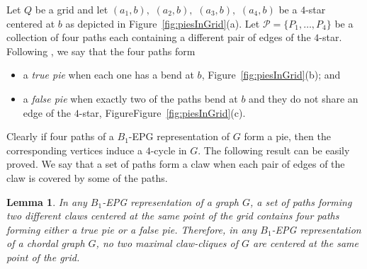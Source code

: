 \documentclass[9pt]{entcs}
\newtheorem{lema}{Lemma}[section]
\newtheorem{defi}{Definition}[section]
\begin{document}

Let $ Q $ be a grid and let $ (a_1, b),$ $(a_2, b),$ $(a_3, b),$ $(a_4, b)$ be a $4$-star centered at $b$ as depicted in Figure~\ref{fig:piesInGrid}(a). Let $ \mathcal{P} = \{P_1, \dots , P_4\}$ be a collection of four paths each containing a different pair of edges of the $4$-star.
Following \cite{golumbic2009}, we say that the four paths form
\begin{itemize}
\item a \emph{true pie} %
when each one has a bend at $b$, Figure~\ref{fig:piesInGrid}(b); and 
\item a \emph {false pie} when exactly two of the paths %
bend at $b$ and they do not share an edge of the $4$-star, FigureFigure~\ref{fig:piesInGrid}(c). %

%


\end{itemize}

Clearly if four paths of a $B_1$-EPG representation of $G$ form a pie, then the corresponding vertices induce a $4$-cycle in $G$. %
The following result can be easily proved. We say that a set of paths form a claw when each pair of edges of the claw is covered by some of the paths.

\begin{lema}\label{lem:twoClawNotSameCenterInChordal}
In any $B_1$-EPG representation of a graph $G$, a set of paths forming two different claws centered at the same point of the grid contains four paths forming either a true pie or a false pie. Therefore, in any $B_1$-EPG representation of a chordal graph $G$, no two maximal claw-cliques of $G$ are centered at the same point of the grid.
\end{lema}

\end{document}
